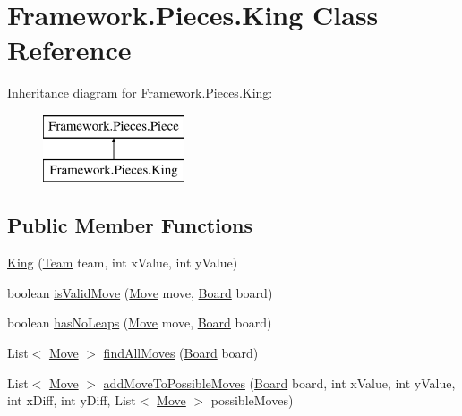 \hypertarget{class_framework_1_1_pieces_1_1_king}{}\section{Framework.\+Pieces.\+King Class Reference}
\label{class_framework_1_1_pieces_1_1_king}
Inheritance diagram for Framework.\+Pieces.\+King\+:\begin{figure}[H]
\begin{center}
\leavevmode
\includegraphics[height=2.000000cm]{class_framework_1_1_pieces_1_1_king}
\end{center}
\end{figure}
\subsection*{Public Member Functions}
\begin{DoxyCompactItemize}
\item 
\hyperlink{class_framework_1_1_pieces_1_1_king_a575f966ed4a301227581a844b85437a4}{King} (\hyperlink{class_framework_1_1_team}{Team} team, int x\+Value, int y\+Value)
\item 
boolean \hyperlink{class_framework_1_1_pieces_1_1_king_a69de9389a669add555f34a8dd8e24a9f}{is\+Valid\+Move} (\hyperlink{class_framework_1_1_move}{Move} move, \hyperlink{class_framework_1_1_board}{Board} board)
\item 
boolean \hyperlink{class_framework_1_1_pieces_1_1_king_a7df52797002424eea43d7c8a657daa5d}{has\+No\+Leaps} (\hyperlink{class_framework_1_1_move}{Move} move, \hyperlink{class_framework_1_1_board}{Board} board)
\item 
List$<$ \hyperlink{class_framework_1_1_move}{Move} $>$ \hyperlink{class_framework_1_1_pieces_1_1_king_ab82bc839741d9c8531f8a9ca500e242b}{find\+All\+Moves} (\hyperlink{class_framework_1_1_board}{Board} board)
\item 
List$<$ \hyperlink{class_framework_1_1_move}{Move} $>$ \hyperlink{class_framework_1_1_pieces_1_1_king_a4d92e625681cb6e64b68803fa41fedc1}{add\+Move\+To\+Possible\+Moves} (\hyperlink{class_framework_1_1_board}{Board} board, int x\+Value, int y\+Value, int x\+Diff, int y\+Diff, List$<$ \hyperlink{class_framework_1_1_move}{Move} $>$ possible\+Moves)
\end{DoxyCompactItemize}


